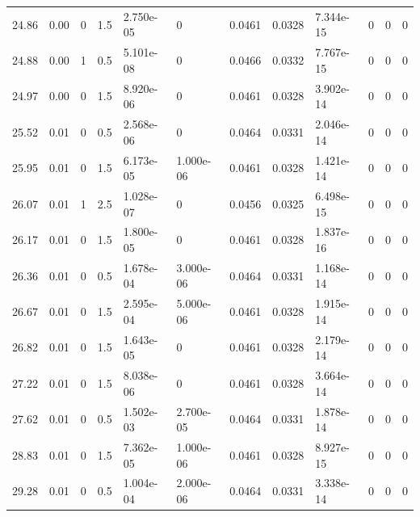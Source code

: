 \documentclass[preview]{standalone}
\begin{document}
{{{\begin{tabular}{L{1.2cm}C{1.2cm} C{0.3cm}C{0.5cm} C{1.4cm}C{1.4cm} C{1.4cm}C{1.4cm} C{1.6cm}C{1.6cm} C{1.6cm}C{1.6cm}}
  24.86  &  0.00  & 0     & 1.5 &  2.750e-05  & 0  &  0.0461&   0.0328& 7.344e-15 & 0   &  0 & 0  \\ 
  24.88  &  0.00  & 1     & 0.5 &  5.101e-08  & 0  &  0.0466&   0.0332& 7.767e-15 & 0   &  0 & 0  \\ 
  24.97  &  0.00  & 0     & 1.5 &  8.920e-06  & 0  &  0.0461&   0.0328& 3.902e-14 & 0   &  0 & 0  \\ 
  25.52  &  0.01  & 0     & 0.5 &  2.568e-06  & 0  &  0.0464&   0.0331& 2.046e-14 & 0   &  0 & 0  \\ 
  25.95  &  0.01  & 0     & 1.5 &  6.173e-05  & 1.000e-06  &  0.0461&   0.0328& 1.421e-14 & 0   &  0 & 0  \\ 
  26.07  &  0.01  & 1     & 2.5 &  1.028e-07  & 0  &  0.0456&   0.0325& 6.498e-15 & 0   &  0 & 0  \\ 
  26.17  &  0.01  & 0     & 1.5 &  1.800e-05  & 0  &  0.0461&   0.0328& 1.837e-16 & 0   &  0 & 0  \\ 
  26.36  &  0.01  & 0     & 0.5 &  1.678e-04  & 3.000e-06  &  0.0464&   0.0331& 1.168e-14 & 0   &  0 & 0  \\ 
  26.67  &  0.01  & 0     & 1.5 &  2.595e-04  & 5.000e-06  &  0.0461&   0.0328& 1.915e-14 & 0   &  0 & 0  \\ 
  26.82  &  0.01  & 0     & 1.5 &  1.643e-05  & 0  &  0.0461&   0.0328& 2.179e-14 & 0   &  0 & 0  \\ 
  27.22  &  0.01  & 0     & 1.5 &  8.038e-06  & 0  &  0.0461&   0.0328& 3.664e-14 & 0   &  0 & 0  \\ 
  27.62  &  0.01  & 0     & 0.5 &  1.502e-03  & 2.700e-05  &  0.0464&   0.0331& 1.878e-14 & 0   &  0 & 0  \\ 
  28.83  &  0.01  & 0     & 1.5 &  7.362e-05  & 1.000e-06  &  0.0461&   0.0328& 8.927e-15 & 0   &  0 & 0  \\ 
  29.28  &  0.01  & 0     & 0.5 &  1.004e-04  & 2.000e-06  &  0.0464&   0.0331& 3.338e-14 & 0   &  0 & 0  \\ 
\hline 
\end{tabular} 

}}}
\end{document}

